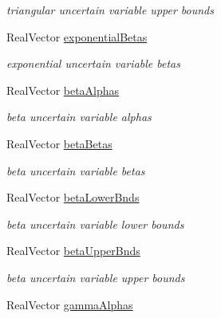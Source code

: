 \begin{DoxyCompactItemize}
\begin{DoxyCompactList}\small\item\em triangular uncertain variable upper bounds \end{DoxyCompactList}\item 
Real\+Vector \hyperlink{classPecos_1_1AleatoryDistParamsRep_a5d594ee9b715dc3acb2062593ec3857c}{exponential\+Betas}\label{classPecos_1_1AleatoryDistParamsRep_a5d594ee9b715dc3acb2062593ec3857c}

\begin{DoxyCompactList}\small\item\em exponential uncertain variable betas \end{DoxyCompactList}\item 
Real\+Vector \hyperlink{classPecos_1_1AleatoryDistParamsRep_a0188364e5ef52848b4511baf5a0fa1d9}{beta\+Alphas}\label{classPecos_1_1AleatoryDistParamsRep_a0188364e5ef52848b4511baf5a0fa1d9}

\begin{DoxyCompactList}\small\item\em beta uncertain variable alphas \end{DoxyCompactList}\item 
Real\+Vector \hyperlink{classPecos_1_1AleatoryDistParamsRep_ad476d0feac84d4ef8f53d4e21333b406}{beta\+Betas}\label{classPecos_1_1AleatoryDistParamsRep_ad476d0feac84d4ef8f53d4e21333b406}

\begin{DoxyCompactList}\small\item\em beta uncertain variable betas \end{DoxyCompactList}\item 
Real\+Vector \hyperlink{classPecos_1_1AleatoryDistParamsRep_a29911b3e54c1610c89d61e29624d753f}{beta\+Lower\+Bnds}\label{classPecos_1_1AleatoryDistParamsRep_a29911b3e54c1610c89d61e29624d753f}

\begin{DoxyCompactList}\small\item\em beta uncertain variable lower bounds \end{DoxyCompactList}\item 
Real\+Vector \hyperlink{classPecos_1_1AleatoryDistParamsRep_ad3a1770173bc58bb83d134198c8f1155}{beta\+Upper\+Bnds}\label{classPecos_1_1AleatoryDistParamsRep_ad3a1770173bc58bb83d134198c8f1155}

\begin{DoxyCompactList}\small\item\em beta uncertain variable upper bounds \end{DoxyCompactList}\item 
Real\+Vector \hyperlink{classPecos_1_1AleatoryDistParamsRep_ad01317da42e4555b43338a78137521ec}{gamma\+Alphas}\label{classPecos_1_1AleatoryDistParamsRep_ad01317da42e4555b43338a78137521ec}


\end{DoxyCompactItemize}
